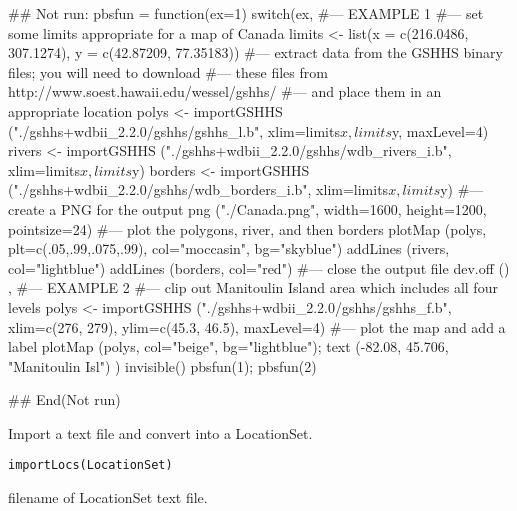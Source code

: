 \documentclass[letterpaper]{book}
\begin{document}
\begin{Examples}
\begin{ExampleCode}
## Not run: 
pbsfun = function(ex=1) {
  switch(ex, {
  #--- EXAMPLE 1
  #--- set some limits appropriate for a map of Canada
  limits <- list(x = c(216.0486, 307.1274), y = c(42.87209, 77.35183))
  #--- extract data from the GSHHS binary files; you will need to download
  #--- these files from http://www.soest.hawaii.edu/wessel/gshhs/
  #--- and place them in an appropriate location
  polys <- importGSHHS ("./gshhs+wdbii_2.2.0/gshhs/gshhs_l.b",
                   xlim=limits$x, limits$y, maxLevel=4)
  rivers <- importGSHHS ("./gshhs+wdbii_2.2.0/gshhs/wdb_rivers_i.b",
                         xlim=limits$x, limits$y)
  borders <- importGSHHS ("./gshhs+wdbii_2.2.0/gshhs/wdb_borders_i.b",
                          xlim=limits$x, limits$y)
  #--- create a PNG for the output
  png ("./Canada.png", width=1600, height=1200, pointsize=24)
  #--- plot the polygons, river, and then borders
  plotMap (polys, plt=c(.05,.99,.075,.99), col="moccasin", bg="skyblue")
  addLines (rivers, col="lightblue")
  addLines (borders, col="red")
  #--- close the output file
  dev.off ()
  },{
  #--- EXAMPLE 2
  #--- clip out Manitoulin Island area which includes all four levels
  polys <- importGSHHS ("./gshhs+wdbii_2.2.0/gshhs/gshhs_f.b",
                        xlim=c(276, 279), ylim=c(45.3, 46.5), maxLevel=4)
  #--- plot the map and add a label
  plotMap (polys, col="beige", bg="lightblue");
  text (-82.08, 45.706, "Manitoulin Isl")
  })
  invisible()
}
pbsfun(1); pbsfun(2)

## End(Not run)
\end{ExampleCode}
\end{Examples}
%
\begin{Description}\relax
Import a text file and convert into a LocationSet.
\end{Description}
%
\begin{Usage}
\begin{verbatim}
importLocs(LocationSet)
\end{verbatim}
\end{Usage}
%
\begin{Arguments}
\begin{ldescription}
\item[\code{LocationSet}] filename of LocationSet text file.
\end{ldescription}
\end{Arguments}
\end{document}
